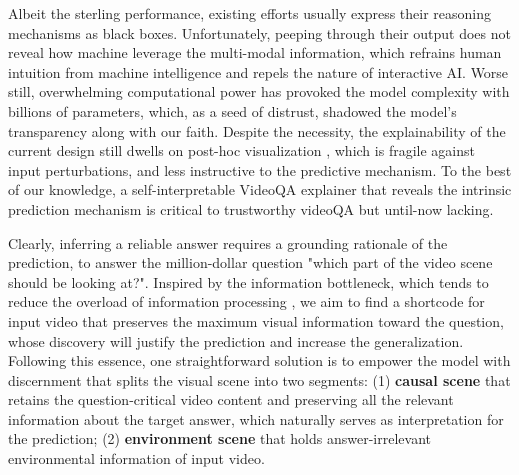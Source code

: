 Albeit the sterling performance, existing efforts usually express their reasoning mechanisms as black boxes. Unfortunately, peeping through their output does not reveal how machine leverage the multi-modal information, which refrains human intuition from machine intelligence and repels the nature of interactive AI. 
Worse still, overwhelming computational power has provoked the model complexity with billions of parameters, which, as a seed of distrust, shadowed the model's transparency along with our faith. 
%
Despite the necessity, the explainability of the current design still dwells on post-hoc visualization \cite{gao2018motionappearance,DBLP:conf/iccv/Liu0WL21,10.1145/3474085.3475620}, which is fragile against input perturbations, and less instructive to the predictive mechanism. 
%
%
To the best of our knowledge, a self-interpretable VideoQA explainer that reveals the intrinsic prediction mechanism is critical to trustworthy videoQA but until-now lacking. 

Clearly, inferring a reliable answer requires a grounding rationale of the prediction, \ie to answer the million-dollar question "which part of the video scene should  be looking at?". 
%
Inspired by the information bottleneck, which tends to reduce the overload of information processing \cite{DBLP:conf/iclr/SaxeBDAKTC18}, we aim to find a shortcode for input video that preserves the maximum visual information toward the question, whose discovery will justify the prediction and increase the generalization. 
%
%
Following this essence, one straightforward solution is to empower the model with discernment that splits the visual scene into two segments: 
(1) \textbf{causal scene} that retains the question-critical video content and preserving all the relevant information about the target answer, which naturally serves as interpretation for the prediction; (2) \textbf{environment scene} that holds answer-irrelevant environmental information of input video. 

